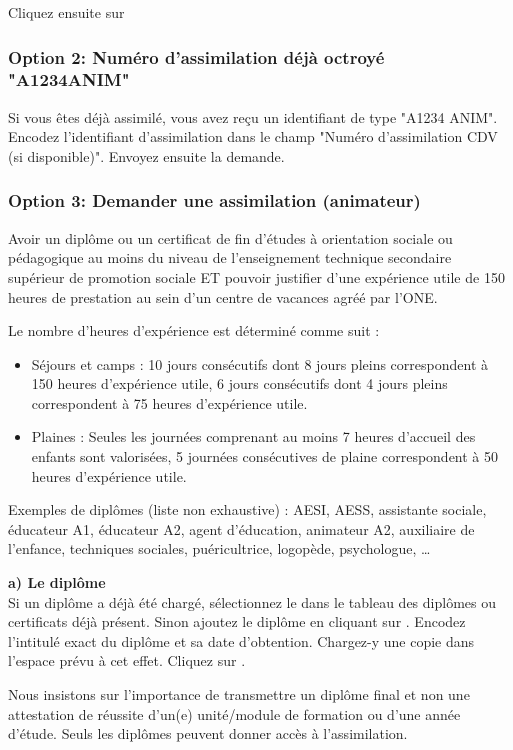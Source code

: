 Cliquez ensuite sur 

\subsubsection{Option 2: Numéro d'assimilation déjà octroyé "A1234ANIM"}
Si vous êtes déjà assimilé, vous avez reçu un identifiant de type "A1234 ANIM". Encodez l'identifiant d'assimilation dans le champ "Numéro d'assimilation CDV (si disponible)". Envoyez ensuite la demande. 
    

\subsubsection{Option 3: Demander une assimilation (animateur)}

\vspace*{2mm}
\begin{tcolorbox}[title=Quelles sont les conditions d'assimilation (Animateur) ? ]
Avoir un diplôme ou un certificat de fin d'études à orientation sociale ou pédagogique au moins du niveau de l’enseignement technique secondaire supérieur de promotion sociale ET pouvoir justifier d’une expérience utile de 150 heures de prestation au sein d’un centre de vacances agréé par l’ONE.

\begin{info}
Le nombre d'heures d'expérience est déterminé comme suit :
\begin{itemize}
    \item Séjours et camps : 10 jours consécutifs dont 8 jours pleins correspondent à 150 heures d'expérience utile, 6 jours consécutifs dont 4 jours pleins correspondent à 75 heures d'expérience utile.
    \item Plaines : Seules les journées comprenant au moins 7 heures d'accueil des enfants sont valorisées, 5 journées consécutives de plaine correspondent à 50 heures d'expérience utile.
\end{itemize}
\end{info}

Exemples de diplômes (liste non exhaustive) : AESI, AESS, assistante sociale, éducateur A1, éducateur A2, agent d’éducation, animateur A2, auxiliaire de l’enfance, techniques sociales, puéricultrice, logopède, psychologue, …

\end{tcolorbox}

\textbf{a) Le diplôme}
\\Si un diplôme a déjà été chargé, sélectionnez le dans le tableau des diplômes ou certificats déjà présent.
Sinon ajoutez le diplôme en cliquant sur . Encodez l'intitulé exact du diplôme et sa date d'obtention. Chargez-y une copie dans l'espace prévu à cet effet. Cliquez sur .
\begin{attention}
Nous insistons sur l’importance de transmettre un diplôme final et non une attestation de réussite d’un(e) unité/module de formation ou d’une année d’étude. Seuls les diplômes peuvent donner accès à l’assimilation.
\end{attention}


